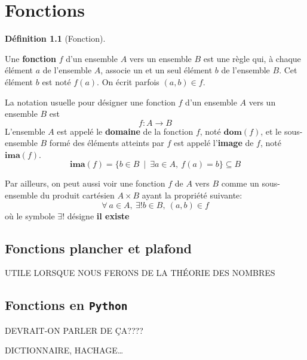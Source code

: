 \documentclass[
  letterpaper,
]{scrbook}
\newcommand{\set}[1]{\{#1\}}
\theoremstyle{definition}
\theoremstyle{definition}
\newtheorem{definition}{Définition}[chapter]
\theoremstyle{plain}
\theoremstyle{remark}
\begin{document}

\hypertarget{fonctions}{%
\chapter{Fonctions}\label{fonctions}}

\leavevmode{}%
\begin{definition}[Fonction]\label{def-fonction}

Une \textbf{fonction} \(f\) d'un ensemble \(A\) vers un ensemble \(B\)
est une règle qui, à chaque élément \(a\) de l'ensemble \(A\), associe
un et un seul élément \(b\) de l'ensemble \(B\). Cet élément \(b\) est
noté \(f(a)\). On écrit parfois \((a,b)\in f\).

La notation usuelle pour désigner une fonction \(f\) d'un ensemble \(A\)
vers un ensemble \(B\) est \[
f:A\rightarrow B
\] L'ensemble \(A\) est appelé le \textbf{domaine} de la fonction \(f\),
noté \(\mathbf{dom} (f)\), et le sous-ensemble \(B\) formé des éléments
atteints par \(f\) est appelé l'\textbf{image} de \(f\), noté
\(\mathbf{ima} (f)\). \[
\mathbf{ima} (f) = \set{b\in B\ \mid\ \exists a\in A,\ f(a)=b} \subseteq B
\]

\end{definition}

Par ailleurs, on peut aussi voir une fonction \(f\) de \(A\) vers \(B\)
comme un sous-ensemble du produit cartésien \(A\times B\) ayant la
propriété suivante: \[
\forall\ a\in A,\ \exists !b\in B,\ (a,b)\in f
\] où le symbole \(\exists !\) désigne \textbf{il existe}

\hypertarget{fonctions-plancher-et-plafond}{%
\section{Fonctions plancher et
plafond}\label{fonctions-plancher-et-plafond}}

UTILE LORSQUE NOUS FERONS DE LA THÉORIE DES NOMBRES

\hypertarget{fonctions-en-python}{%
\section{\texorpdfstring{Fonctions en
\texttt{Python}}{Fonctions en Python}}\label{fonctions-en-python}}

DEVRAIT-ON PARLER DE ÇA????

DICTIONNAIRE, HACHAGE\ldots{}
\end{document}
